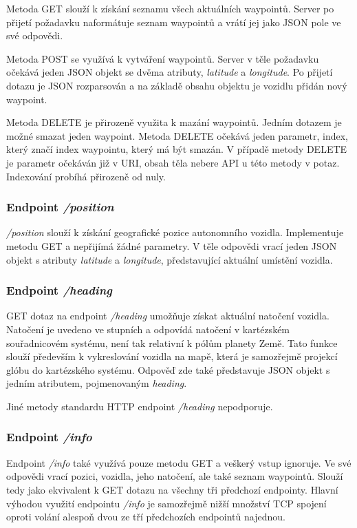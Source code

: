 \documentclass[czech,bachelor,dept460,male,cpp,cpdeclaration]{diploma}
\begin{document}
Metoda GET slouží k získání seznamu všech aktuálních waypointů. Server po přijetí požadavku naformátuje seznam waypointů a vrátí 
jej jako JSON pole ve své odpovědi.

Metoda POST se využívá k vytváření waypointů. Server v těle požadavku očekává jeden JSON objekt se dvěma atributy, \emph{latitude}
a \emph{longitude}. Po přijetí dotazu je JSON rozparsován a na základě obsahu objektu je vozidlu přidán nový waypoint.

Metoda DELETE je přirozeně využita k mazání waypointů. Jedním dotazem je možné smazat jeden waypoint. Metoda DELETE očekává jeden
parametr, index, který značí index waypointu, který má být smazán. V případě metody DELETE je parametr očekáván již v URI, obsah
těla nebere API u této metody v potaz. Indexování probíhá přirozeně od nuly. 

\subsubsection{Endpoint \emph{/position}}

\emph{/position} slouží k získání geografické pozice autonomního vozidla. Implementuje metodu GET a nepřijímá žádné parametry. 
V těle odpovědi vrací jeden JSON objekt s atributy \emph{latitude} a \emph{longitude}, představující aktuální umístění vozidla.

\subsubsection{Endpoint \emph{/heading}}

GET dotaz na endpoint \emph{/heading} umožňuje získat aktuální natočení vozidla. Natočení je uvedeno ve stupních a odpovídá 
natočení v kartézském souřadnicovém systému, není tak relativní k pólům planety Země. Tato funkce slouží především k vykreslování
vozidla na mapě, která je samozřejmě projekcí glóbu do kartézského systému. Odpověď zde také představuje JSON objekt s jedním 
atributem, pojmenovaným \emph{heading}. 

Jiné metody standardu HTTP endpoint \emph{/heading} nepodporuje.

\subsubsection{Endpoint \emph{/info}}

Endpoint \emph{/info} také využívá pouze metodu GET a veškerý vstup ignoruje. Ve své odpovědi vrací pozici, vozidla, jeho 
natočení, ale také seznam waypointů. Slouží tedy jako ekvivalent k GET dotazu na všechny tři předchozí endpointy. Hlavní výhodou
využití endpointu \emph{/info} je samozřejmě nižší množství TCP spojení oproti volání alespoň dvou ze tří předchozích endpointů 
najednou.
\end{document}
